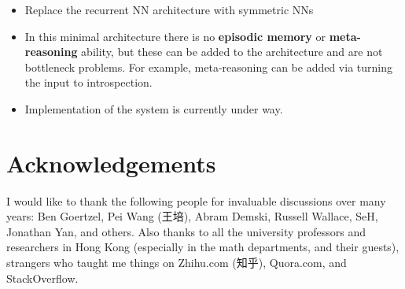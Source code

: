\documentclass[orivec]{llncs}
\begin{document}
\begin{itemize}
	\item Replace the recurrent NN architecture with symmetric NNs
	\item In this minimal architecture there is no \textbf{episodic memory} or \textbf{meta-reasoning} ability, but these can be added to the architecture and are not bottleneck problems.  For example, meta-reasoning can be added via turning the input to introspection.
	\item Implementation of the system is currently under way.
\end{itemize}

\section*{Acknowledgements}

I would like to thank the following people for invaluable discussions over many years:  Ben Goertzel, Pei Wang (王培), Abram Demski, Russell Wallace, SeH, Jonathan Yan, and others.  Also thanks to all the university professors and researchers in Hong Kong (especially in the math departments, and their guests), strangers who taught me things on Zhihu.com (知乎), Quora.com, and StackOverflow.


\end{document}
